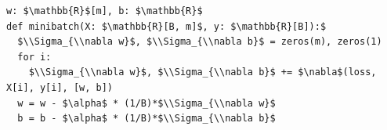 \documentclass[border=10pt]{standalone}
\begin{document}
\begin{lstlisting}
w: $\mathbb{R}$[m], b: $\mathbb{R}$
def minibatch(X: $\mathbb{R}[B, m]$, y: $\mathbb{R}[B]):$
  $\\Sigma_{\\nabla w}$, $\\Sigma_{\\nabla b}$ = zeros(m), zeros(1)
  for i:
    $\\Sigma_{\\nabla w}$, $\\Sigma_{\\nabla b}$ += $\nabla$(loss, X[i], y[i], [w, b])
  w = w - $\alpha$ * (1/B)*$\\Sigma_{\\nabla w}$
  b = b - $\alpha$ * (1/B)*$\\Sigma_{\\nabla b}$
\end{lstlisting}
\end{document}
